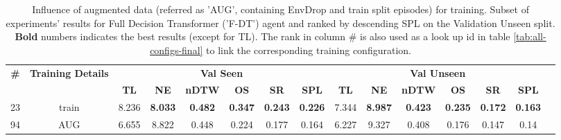 \begin{table}
\centering
\caption{\label{tab:f_dt_env_drop}Influence of augmented data (referred as 'AUG', containing EnvDrop and train split episodes) for training. Subset of experiments' results for Full Decision Transformer ('F-DT') agent and ranked by descending SPL on the Validation Unseen split. \textbf{Bold} numbers indicates the best results (except for TL). The rank in column \# is also used as a look up id in table \ref{tab:all-configs-final} to link the corresponding training configuration.}
\begin{tabular}{@{\hskip3pt}c@{\hskip3pt}c@{\hskip3pt}c@{\hskip3pt}c@{\hskip3pt}c@{\hskip3pt}c@{\hskip3pt}c@{\hskip3pt}c@{\hskip3pt}c@{\hskip3pt}c@{\hskip3pt}c@{\hskip3pt}c@{\hskip3pt}c@{\hskip3pt}c@{\hskip3pt}c}
\toprule
                                  \textbf{\#} & \textbf{Training Details} & \multicolumn{6}{c}{\textbf{Val Seen}} & \multicolumn{6}{c}{\textbf{Val Unseen}} \\
\cmidrule(l){3-8}\cmidrule(l){9-14}\textbf{~} &                \textbf{~} &       \textbf{TL} &     \textbf{NE} &   \textbf{nDTW} &     \textbf{OS} &     \textbf{SR} &    \textbf{SPL} &         \textbf{TL} &     \textbf{NE} &   \textbf{nDTW} &     \textbf{OS} &     \textbf{SR} &    \textbf{SPL} \\
\midrule
                                           23 &                     train &             8.236 &  \textbf{8.033} &  \textbf{0.482} &  \textbf{0.347} &  \textbf{0.243} &  \textbf{0.226} &               7.344 &  \textbf{8.987} &  \textbf{0.423} &  \textbf{0.235} &  \textbf{0.172} &  \textbf{0.163} \\
                                           94 &                       AUG &             6.655 &           8.822 &           0.448 &           0.224 &           0.177 &           0.164 &               6.227 &           9.327 &           0.408 &           0.176 &           0.147 &            0.14 \\
\bottomrule
\end{tabular}
\end{table}
